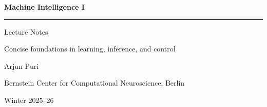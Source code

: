 \begin{titlepage}
  \centering
  \vspace*{3cm}

  {\sffamily\Huge\bfseries Machine Intelligence I}

  \vspace{0.6cm}
  {\rule{0.4\textwidth}{0.6pt}}

  \vspace{0.6cm}
  {\sffamily\Large Lecture Notes}

  \vspace{0.8cm}
  {\large Concise foundations in learning, inference, and control}

  \vspace{2.4cm}
  {\large Arjun Puri}

  \vspace{0.4cm}
  {\normalsize Bernstein Center for Computational Neuroscience, Berlin}

  \vfill

  {\small Winter 2025--26}

  \vspace{1cm}
\end{titlepage}
